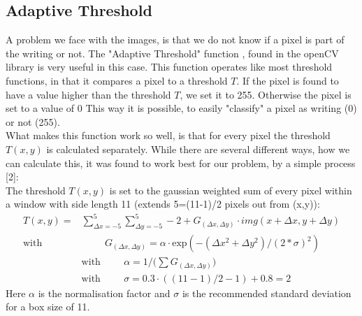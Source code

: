 \documentclass[12pt]{article}
\begin{document}
	\subsection{Adaptive Threshold} %
		A problem we face with the images, is that we do not know if a pixel is part of the writing or not.
		The "Adaptive Threshold" function \cite{adaThresh}, found in the openCV library is very useful in this case. %
		This function operates like most threshold functions, in that it compares a pixel to a threshold $T$.
		If the pixel is found to have a value higher than the threshold $T$, we set it to 255.
		Otherwise the pixel is set to a value of 0 \cite{cvAdaThresh}
		This way it is possible, to easily "classify" a pixel as writing (0) or not (255).\\
		What makes this function work so well, is that for every pixel the threshold $T(x,y)$ is calculated separately.
		While there are several different ways, how we can calculate this, it was found to work best for our problem, by a simple process [2]:\\
		The threshold $T(x,y)$ is set to the gaussian weighted sum of every pixel within a window with side length 11 (extends 5=(11-1)/2 pixels out from (x,y)):
		\begin{align}
			T(x,y)=&\sum_{\Delta x=-5}^{5}\sum_{\Delta y=-5}^{5} -2 + G_{(\Delta x,\Delta y)} \cdot img(x+\Delta x,y+\Delta y)\\
			\mathrm{with}& \hspace{1cm} G_{(\Delta x,\Delta y)} = \alpha \cdot \mathrm{exp}(-(\Delta x ^2 +\Delta y^2)/(2*\sigma)^2)\\ %
			&\mathrm{with} \hspace{1cm}\alpha = 1/\Big(\sum G_{(\Delta x,\Delta y)}\Big)\\
			&\mathrm{with} \hspace{1cm}\sigma = 0.3 \cdot ((11-1)/2-1) + 0.8 = 2
		\end{align}
		Here $\alpha$ is the normalisation factor and $\sigma$ is the recommended standard deviation for a box size of 11.
	
\end{document}

